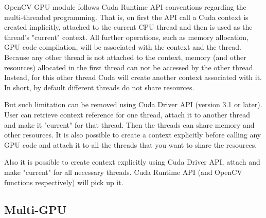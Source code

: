 OpenCV GPU module follows Cuda Runtime API conventions regarding the multi-threaded programming. That is, on first the API call a Cuda context is created implicitly, attached to the current CPU thread and then is used as the thread's "current" context. All further operations, such as memory allocation, GPU code compilation, will be associated with the context and the thread. Because any other thread is not attached to the context, memory (and other resources) allocated in the first thread can not be accessed by the other thread. Instead, for this other thread Cuda will create another context associated with it. In short, by default different threads do not share resources.

But such limitation can be removed using Cuda Driver API (version 3.1 or later). User can retrieve context reference for one thread, attach it to another thread and make it "current" for that thread. Then the threads can share memory and other resources. It is also possible to create a context explicitly before calling any GPU code and attach it to all the threads that you want to share the resources.

Also it is possible to create context explicitly using Cuda Driver API, attach and make "current" for all necessary threads. Cuda Runtime API (and OpenCV functions respectively) will pick up it. 

\subsection{Multi-GPU}

